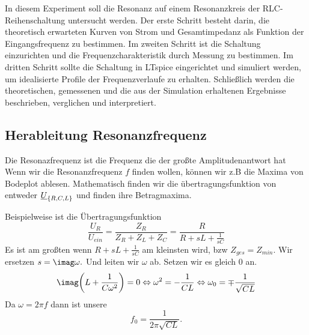 %
%
%
%
%
In diesem Experiment soll die Resonanz auf einem Resonanzkreis der RLC-Reihenschaltung untersucht werden. Der erste Schritt besteht darin, die theoretisch erwarteten Kurven von Strom und Gesamtimpedanz als Funktion der Eingangsfrequenz zu bestimmen. Im zweiten Schritt ist die Schaltung einzurichten und die Frequenzcharakteristik durch Messung zu bestimmen. Im dritten Schritt sollte die Schaltung in LTspice eingerichtet und simuliert werden, um idealisierte Profile der Frequenzverlaufe zu erhalten. Schließlich werden die theoretischen, gemessenen und die aus der Simulation erhaltenen Ergebnisse beschrieben, verglichen und interpretiert.
\begin{flushright}
  \textit{\autorA}
\end{flushright}
%
%
%
\subsection{Herableitung Resonanzfrequenz}
Die Resonazfrequenz ist die Frequenz die der großte Amplitudenantwort hat
Wenn wir die Resonanzfrequenz $f$ finden wollen, können wir z.B die Maxima von Bodeplot ablesen. Mathematisch finden wir die übertragungsfunktion von entweder $\underline{U}_\qty{R,C,L}$ und finden ihre Betragmaxima.

Beispielweise ist die Übertragungsfunktion \[\frac{U_R}{U_{ein}}=\frac{Z_R}{Z_R+Z_L+Z_C}=\frac{R}{R+sL+\frac{1}{sC}}\]
Es ist am großten wenn $R+sL+\frac{1}{sC}$ am kleinsten wird, bzw $Z_{ges}=Z_{min}.$
Wir ersetzen $s=\imag \omega.$
Und leiten wir $\omega$ ab. Setzen wir es gleich 0 an.
\[\imag\qty(L+\frac{1}{C \omega^2})=0\>\omega^2=-\frac{1}{C L}\>\omega_0=\mp \frac{1}{\sqrt{CL}}\]
Da $\omega = 2 \pi f$ dann ist unsere \[f_0=\frac{1}{2 \pi \sqrt{C L}}.\]

